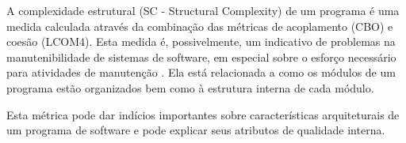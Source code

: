 A complexidade estrutural (SC - Structural Complexity) de um programa é uma
medida calculada através da combinação das métricas de acoplamento (CBO) e
coesão (LCOM4).  Esta medida é, possivelmente, um indicativo de problemas na
manutenibilidade de sistemas de software, em especial sobre o esforço
necessário para atividades de manutenção \cite{Terceiro2012}. Ela está
relacionada a como os módulos de um programa estão organizados bem como à
estrutura interna de cada módulo.

Esta métrica pode dar indícios importantes sobre características arquiteturais
de um programa de software e pode explicar seus atributos de qualidade
interna.

